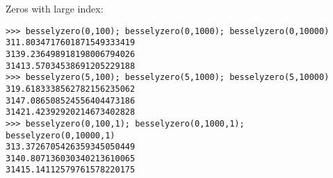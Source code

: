 Zeros with large index:

\begin{lstlisting}
>>> besselyzero(0,100); besselyzero(0,1000); besselyzero(0,10000)
311.8034717601871549333419
3139.236498918198006794026
31413.57034538691205229188
>>> besselyzero(5,100); besselyzero(5,1000); besselyzero(5,10000)
319.6183338562782156235062
3147.086508524556404473186
31421.42392920214673402828
>>> besselyzero(0,100,1); besselyzero(0,1000,1); besselyzero(0,10000,1)
313.3726705426359345050449
3140.807136030340213610065
31415.14112579761578220175
\end{lstlisting}


%
%
%
%
%
%
%
%
%
%
